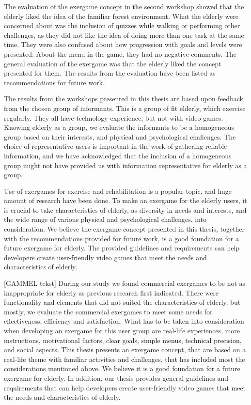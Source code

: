 The evaluation of the exergame concept in the second workshop showed that the elderly liked the idea of the familiar forest environment. What the elderly were concerned about was the inclusion of quizzes while walking or performing other challenges, as they did not like the idea of doing more than one task at the same time. They were also confused about how progression with goals and levels were presented. About the menu in the game, they had no negative comments. The general evaluation of the exergame was that the elderly liked the concept presented for them. The results from the evaluation have been listed as recommendations for future work. 

The results from the workshops presented in this thesis are based upon feedback from the chosen group of informants. This is a group of fit elderly, which exercise regularly. They all have technology experience, but not with video games. Knowing elderly as a group, we evaluate the informants to be a homogeneous group based on their interests, and physical and psychological challenges. The choice of representative users is important in the work of gathering reliable information, and we have acknowledged that the inclusion of a homogeneous group might not have provided us with information representative for elderly as a group.       

Use of exergames for exercise and rehabilitation is a popular topic, and huge amount of research have been done. To make an exergame for the elderly users, it is crucial to take characteristics of elderly, as diversity in needs and interests, and the wide range of various physical and psychological challenges, into consideration. We believe the exergame concept presented in this thesis, together with the recommendations provided for future work, is a good foundation for a future exergame for elderly. The provided guidelines and requirements can help developers create user-friendly video games that meet the needs and characteristics of elderly.

[GAMMEL tekst]
During our study we found commercial exergames to be not as inappropriate for elderly as previous research first indicated. There were functionality and elements that did not suited the characteristics of elderly, but mostly, we evaluate the commercial exergames to meet some needs for effectiveness, efficiency and satisfaction.  What has to be taken into consideration when developing an exergame for this user group are real-life experiences, more instructions, motivational factors, clear goals, simple menus, technical precision, and social aspects. This thesis presents an exergame concept, that are based on a real-life theme with familiar activities and challenges, that has included most the considerations mentioned above. We believe it is a good foundation for a future exergame for elderly. In addition, our thesis provides general guidelines and requirements that can help developers create user-friendly video games that meet the needs and characteristics of elderly.  

